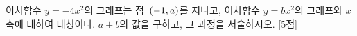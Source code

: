 이차함수 $y=-4x^2$의 그래프는 점~$(-1{,}\mkern3mu a)$를 지나고, 이차함수 $y=bx^2$의 그래프와 $x$축에 대하여 대칭이다. $a+b$의 값을 구하고, 그 과정을 서술하시오.  \mbox{[5점]}
